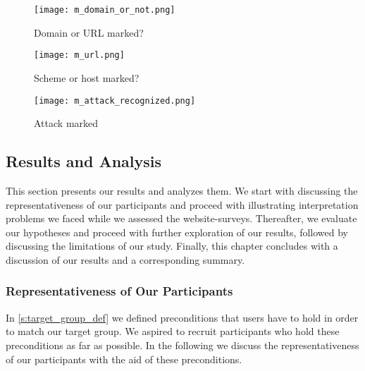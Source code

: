 \begin{figure}[H]
\centering
\texttt{[image: m\_domain\_or\_not.png]}
\caption{Domain or URL marked?}
\label{fig:m_domain_or_not}
\end{figure}

\begin{figure}[H]
\centering
\texttt{[image: m\_url.png]}
\caption{Scheme or host marked?}
\label{fig:m_url}
\end{figure}

\begin{figure}[H]
\centering
\texttt{[image: m\_attack\_recognized.png]}
\caption{Attack marked}
\label{fig:m_attack_recognized}
\end{figure}

\subsection{Results and Analysis}
This section presents our results and analyzes them. 
We start with discussing the representativeness of our participants and proceed with illustrating interpretation problems we faced while we assessed the website-surveys.
Thereafter, we evaluate our hypotheses and proceed with further exploration of our results, followed by discussing the limitations of our study.
Finally, this chapter concludes with a discussion of our results and a corresponding summary. 
\subsubsection{Representativeness of Our Participants}
\label{s:representativeness}
In \autoref{s:target_group_def} we defined preconditions that users have to hold in order to match our target group.
We aspired to recruit participants who hold these preconditions as far as possible.
In the following we discuss the representativeness of our participants with the aid of these preconditions.

